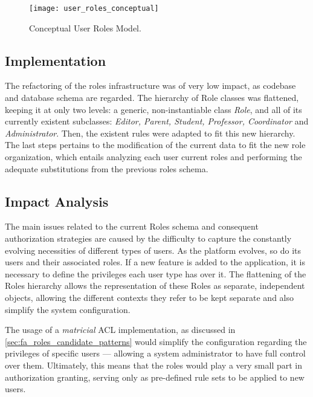 \begin{figure}[H]
  \centering
  \texttt{[image: user\_roles\_conceptual]}
  \caption{Conceptual User Roles Model.}
  \label{fig:user_roles_conceptual}
\end{figure}

\subsection{Implementation}\label{sec:fa_roles_implementation}

The refactoring of the roles infrastructure was of very low impact, as codebase and database schema are regarded. The hierarchy of Role classes was flattened, keeping it at only two levels: a generic, non-instantiable class \emph{Role}, and all of its currently existent subclasses: \emph{Editor, Parent, Student, Professor, Coordinator} and \emph{Administrator}. Then, the existent rules were adapted to fit this new hierarchy. The last steps pertains to the modification of the current data to fit the new role organization, which entails analyzing each user current roles and performing the adequate substitutions from the previous roles schema. 

\subsection{Impact Analysis}\label{sec:fa_roles_impact_analysis}

The main issues related to the current Roles schema and consequent authorization strategies are caused by the difficulty to capture the constantly evolving necessities of different types of users. As the platform evolves, so do its users and their associated roles. If a new feature is added to the application, it is necessary to define the privileges each user type has over it. The flattening of the Roles hierarchy allows the representation of these Roles as separate, independent objects, allowing the different contexts they refer to be kept separate and also simplify the system configuration.

The usage of a \emph{matricial} ACL implementation, as discussed in \ref{sec:fa_roles_candidate_patterns} would simplify the configuration regarding the privileges of specific users --- allowing a system administrator to have full control over them. Ultimately, this means that the roles would play a very small part in authorization granting, serving only as pre-defined rule sets to be applied to new users.

